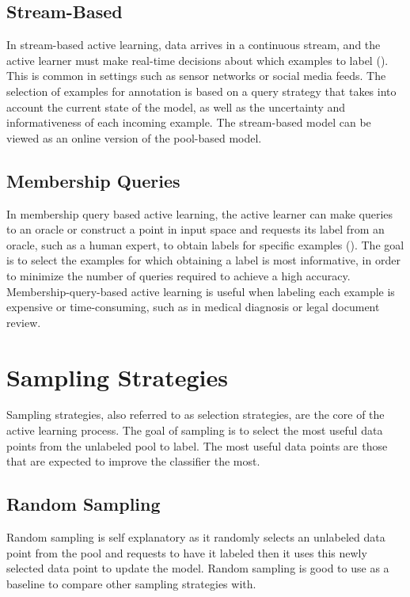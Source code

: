 \subsection{Stream-Based}
In stream-based active learning, data arrives in a continuous stream, and the active learner must make real-time decisions about which examples to label (\cite{baram2004online}). This is common in settings such as sensor networks or social media feeds. The selection of examples for annotation is based on a query strategy that takes into account the current state of the model, as well as the uncertainty and informativeness of each incoming example. The stream-based model can be viewed as an online version of the pool-based model. 

\subsection{Membership Queries}

In membership query based active learning, the active learner can make queries to an oracle or construct a point in input space and requests its label from an oracle, such as a human expert, to obtain labels for specific examples (\cite{baram2004online}). The goal is to select the examples for which obtaining a label is most informative, in order to minimize the number of queries required to achieve a high accuracy. Membership-query-based active learning is useful when labeling each example is expensive or time-consuming, such as in medical diagnosis or legal document review.

\section{Sampling Strategies}

Sampling strategies, also referred to as selection strategies, are the core of the active learning process. The goal of sampling is to select the most useful data points from the unlabeled pool to label. The most useful data points are those that are expected to improve the classifier the most.

\subsection{Random Sampling}

Random sampling is self explanatory as it randomly selects an unlabeled data point from the pool and requests to have it labeled then it uses this newly selected data point to update the model. Random sampling is good to use as a baseline to compare other sampling strategies with.

